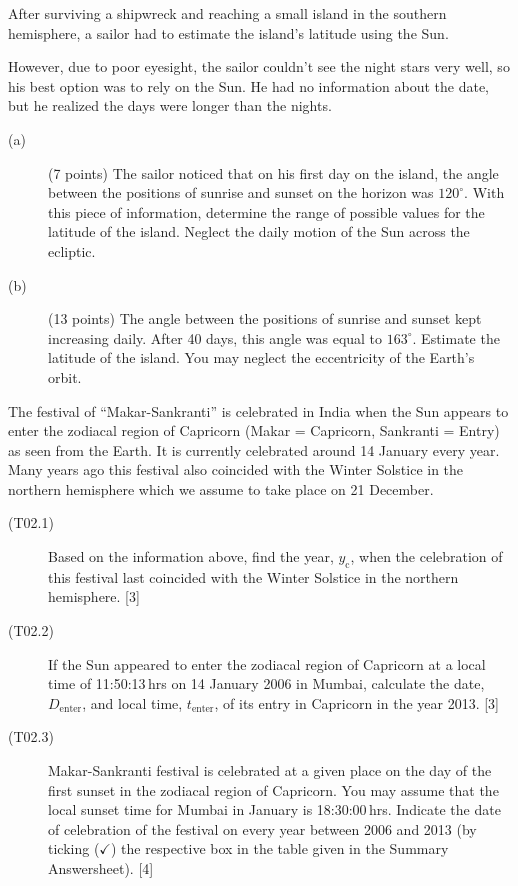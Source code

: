 After surviving a shipwreck and reaching a small island in the southern
hemisphere, a sailor had to estimate the island's latitude using the Sun.

However, due to poor eyesight, the sailor couldn't see the night stars very
well, so his best option was to rely on the Sun. He had no information about
the date, but he realized the days were longer than the nights.

\begin{description}
\item[(a)] (7 points) The sailor noticed that on his first day on the island,
  the angle between the positions of sunrise and sunset on the horizon was
  $120^\circ$. With this piece of information, determine the range of possible
  values for the latitude of the island. Neglect the daily motion of the Sun
  across the ecliptic.
\item[(b)] (13 points) The angle between the positions of sunrise and sunset
  kept increasing daily. After 40 days, this angle was equal to $163^\circ$.
  Estimate the latitude of the island. You may neglect the eccentricity of the
  Earth's orbit.
\end{description}

The festival of ``Makar-Sankranti'' is celebrated in India when the Sun appears
to enter the zodiacal region of Capricorn (Makar = Capricorn, Sankranti =
Entry) as seen from the Earth. It is currently celebrated around 14 January
every year. Many years ago this festival also coincided with the Winter
Solstice in the northern hemisphere which we assume to take place on 21
December.

\begin{description}
\item[(T02.1)] Based on the information above, find the year, $y_{\mathrm{c}}$,
  when the celebration of this festival last coincided with the Winter Solstice
  in the northern hemisphere. \hfill[3]
\item[(T02.2)] If the Sun appeared to enter the zodiacal region of Capricorn at
  a local time of 11:50:13\,hrs on 14 January 2006 in Mumbai, calculate the
  date, $D_{\mathrm{enter}}$, and local time, $t_{\mathrm{enter}}$, of its
  entry in Capricorn in the year 2013. \hfill[3]
\item[(T02.3)] Makar-Sankranti festival is celebrated at a given place on the
  day of the first sunset in the zodiacal region of Capricorn. You may assume
  that the local sunset time for Mumbai in January is 18:30:00\,hrs. Indicate
  the date of celebration of the festival on every year between 2006 and 2013
  (by ticking ($\checkmark$) the respective box in the table given in the
  Summary Answersheet). \hfill[4]
\end{description}

